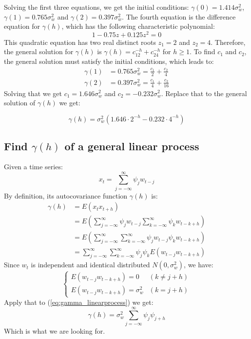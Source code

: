 Solving the first three equations, we get the initial conditions: $\gamma(0) = 1.414\sigma_w^2$, $\gamma(1) = 0.765\sigma_w^2$ and $\gamma(2) = 0.397\sigma_w^2$. The fourth equation is the difference equation for $\gamma(h)$, which has the following characteristic polynomial:
\begin{equation}
1-0.75z+0.125z^2 = 0
\end{equation}
This quadratic equation has two real distinct roots $z_1 = 2$ and $z_2 = 4$. Therefore, the general solution for $\gamma(h)$ is $\gamma(h) = c_12^{-h} + c_24^{-h}$ for $h\geq 1$. To find $c_1$ and $c_2$, the general solution must satisfy the initial conditions, which leads to:
\begin{equation}
\begin{split}
\gamma(1) &= 0.765 \sigma_w^2 = \frac{c_1}{2} + \frac{c_2}{4}\\
\gamma(2) &= 0.397 \sigma_w^2 = \frac{c_1}{4} + \frac{c_2}{16} 
\end{split}
\end{equation}
Solving that we get $c_1 = 1.646 \sigma_w^2$ and $c_2 = -0.232\sigma_w^2$. Replace that to the general solution of $\gamma(h)$ we get:

\begin{equation} \label{eq:gamma_h}
\gamma(h) = \sigma_w^2(1.646 \cdot 2^{-h} - 0.232 \cdot 4^{-h})
\end{equation}

\subsection{Find $\gamma(h)$ of a general linear process}
Given a time series:
\begin{equation}
x_t = \sum_{j = -\infty}^{\infty} \psi_j w_{t-j}
\end{equation}
By definition, its autocovariance function $\gamma(h)$ is:
\begin{equation} \label{eq:gamma_linearprocess}
\begin{split}
\gamma(h) &= E(x_t x_{t+h}) \\
&= E(\sum_{j = -\infty}^{\infty} \psi_j w_{t-j} \sum_{k = -\infty}^{\infty} \psi_k w_{t-k+h})\\
&= E(\sum_{j = -\infty}^{\infty} \sum_{k = -\infty}^{\infty} \psi_j w_{t-j} \psi_k w_{t-k+h})\\
&= \sum_{j = -\infty}^{\infty} \sum_{k = -\infty}^{\infty}  \psi_j \psi_k E(w_{t-j} w_{t-k+h})
\end{split}
\end{equation}
Since $w_t$ is independent and identical distributed $N(0, \sigma_w^2)$, we have:
\begin{equation}
\begin{cases}
E(w_{t-j}w_{t-k+h}) = 0 &(k \neq j+h ) \\
E(w_{t-j}w_{t-k+h}) = \sigma_w^2 &( k = j+h)
\end{cases}
\end{equation}
Apply that to (\ref{eq:gamma_linearprocess}) we get:
\begin{equation}
\gamma(h) = \sigma_w^2  \sum_{j = -\infty}^{\infty} \psi_j \psi_{j+h}
\end{equation}
Which is what we are looking for.

